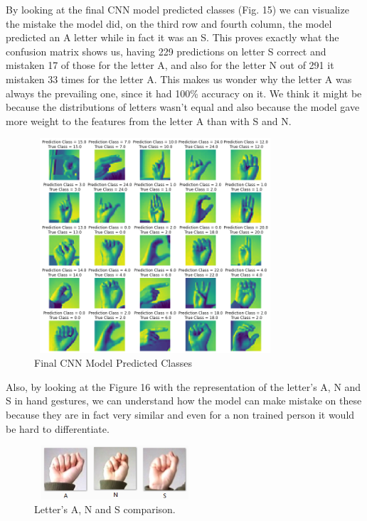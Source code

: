 \documentclass[conference]{IEEEtran}
\begin{document}
By looking at the final CNN model predicted classes (Fig. 15) we can visualize the mistake the model did, on the third row and fourth column, the model predicted an A letter while in fact it was an S. This proves exactly what the confusion matrix shows us, having 229 predictions on letter S correct and mistaken 17 of those for the letter A, and also for the letter N out of 291 it mistaken 33 times for the letter A. This makes us wonder why the letter A was always the prevailing one, since it had 100\% accuracy on it. We think it might be because the distributions of letters wasn't  equal and also because the model gave more weight to the features from the letter A than with S and N.

\begin{figure}[htbp]
    \centerline{\includegraphics[width=9cm,height=8cm]{img/final_model_predictions.png}}
    \caption{Final CNN Model Predicted Classes}
    \label{fig:hist_train_classes}
\end{figure}


Also, by looking at the Figure 16 with the representation of the letter's A, N and S in hand gestures, we can understand how the model can make mistake on these because they are in fact very similar and even for a non trained person it would be hard to differentiate.

\begin{figure}[htbp]
    \centerline{\includegraphics[width=6cm,height=2cm]{img/letters_comparison.png}}
    \caption{Letter's A, N and S comparison.}
    \label{fig:hist_train_classes}
\end{figure}
\end{document}
